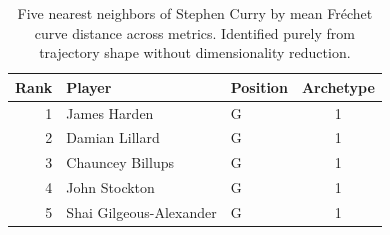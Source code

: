 \begin{table}[htbp]
  \centering\small
  \begin{tabular}{rllc}
    \toprule
    Rank & Player & Position & Archetype \\
    \midrule
    1 & James Harden & G & 1 \\
    2 & Damian Lillard & G & 1 \\
    3 & Chauncey Billups & G & 1 \\
    4 & John Stockton & G & 1 \\
    5 & Shai Gilgeous-Alexander & G & 1 \\
    \bottomrule
  \end{tabular}
  \caption{Five nearest neighbors of Stephen Curry by mean Fr\'{e}chet curve distance across metrics. Identified purely from trajectory shape without dimensionality reduction.}
  \label{tab:Stephen_Curry_frechet_curve_neighbors}
\end{table}

